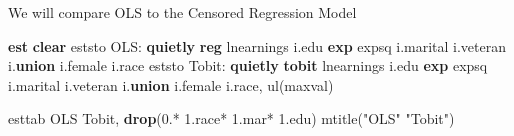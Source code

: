 \documentclass[
]{book}
\newenvironment{Shaded}{\begin{snugshade}}{\end{snugshade}}
\newcommand{\FunctionTok}[1]{\textcolor[rgb]{0.13,0.29,0.53}{\textbf{#1}}}
\newcommand{\KeywordTok}[1]{\textcolor[rgb]{0.13,0.29,0.53}{\textbf{#1}}}
\newcommand{\NormalTok}[1]{#1}
\newcommand{\OtherTok}[1]{\textcolor[rgb]{0.56,0.35,0.01}{#1}}
\newcommand{\StringTok}[1]{\textcolor[rgb]{0.31,0.60,0.02}{#1}}
\begin{document}
We will compare OLS to the Censored Regression Model

\begin{Shaded}
\begin{Highlighting}[]
\KeywordTok{est} \KeywordTok{clear}
\NormalTok{eststo OLS: }\KeywordTok{quietly} \KeywordTok{reg}\NormalTok{ lnearnings i.edu }\FunctionTok{exp}\NormalTok{ expsq i.marital i.veteran i.}\KeywordTok{union}\NormalTok{ i.female i.race}
\NormalTok{eststo Tobit: }\KeywordTok{quietly} \KeywordTok{tobit}\NormalTok{ lnearnings i.edu }\FunctionTok{exp}\NormalTok{ expsq i.marital i.veteran i.}\KeywordTok{union}\NormalTok{ i.female i.race, ul(}\OtherTok{\textasciigrave{}maxval\textquotesingle{}}\NormalTok{)}

\NormalTok{esttab OLS Tobit, }\KeywordTok{drop}\NormalTok{(0.* 1.race* 1.mar* 1.edu) mtitle(}\StringTok{"OLS"} \StringTok{"Tobit"}\NormalTok{)}
\end{Highlighting}
\end{Shaded}
\end{document}
